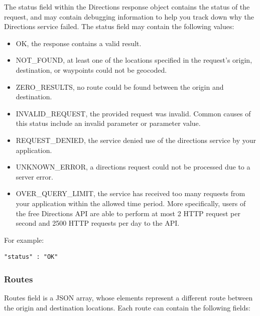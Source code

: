 The status field within the Directions response object contains the status of the request, and may contain debugging information to help you track down why 
the Directions service failed. The status field may contain the following values:

\begin{itemize}
 \item OK, the response contains a valid result. 
 \item NOT\_FOUND, at least one of the locations specified in the request's origin, destination, or waypoints could not be geocoded.
 \item ZERO\_RESULTS, no route could be found between the origin and destination.
 \item INVALID\_REQUEST, the provided request was invalid. Common causes of this status include an invalid parameter or parameter value.
 \item REQUEST\_DENIED, the service denied use of the directions service by your application. 
 \item UNKNOWN\_ERROR, a directions request could not be processed due to a server error. 
 \item OVER\_QUERY\_LIMIT, the service has received too many requests from your application within the allowed time period. 
 More specifically, users of the free Directions API are able to perform at most 2 HTTP request per second and 2500 HTTP requests per day to the API.

\end{itemize}

For example:

\begin{lstlisting}[basicstyle=\footnotesize\ttfamily, breaklines=true]
 "status" : "OK"
\end{lstlisting}

\subsubsection{Routes}

Routes field is a JSON array, whose elements represent a different route between the origin and destination locations. Each route can contain the following 
fields:

